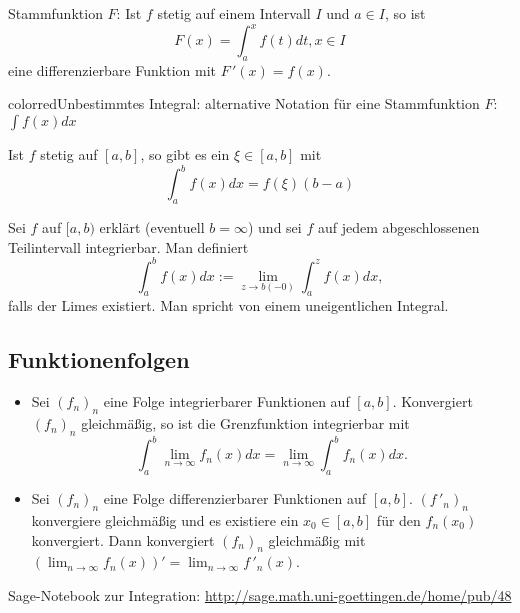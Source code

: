 \documentclass[a4paper,12pt,DIV15]{scrartcl}
\begin{document}
\begin{thm}
{\color{red} Stammfunktion} $F$: Ist $f$ stetig auf einem Intervall $I$ und $a \in I$, so ist 
\[F(x)= \int_a^x f(t) dt, x \in I \] eine differenzierbare Funktion mit
$F\,'(x)=f(x)$. 
\end{thm}
\begin{thm}
{color{red}Unbestimmtes Integral}: alternative Notation für eine Stammfunktion $F$:  $\int f(x) dx$ 
\end{thm}
\begin{thm}
Ist $f$ stetig auf $[a,b]$, so gibt es ein $\xi \in [a,b]$ mit
\[\int_a^b f(x)dx = f(\xi) (b-a)\]
\end{thm}



\begin{defn}
Sei $f$ auf $[a,b)$ erklärt (eventuell $b=\infty$) und sei $f$ auf jedem
abgeschlossenen Teilintervall integrierbar. Man definiert
\[  \int_a^b f(x)dx := \lim_{z \rightarrow b (-0)} \int_a^z f(x)dx,\]
falls der Limes existiert. Man spricht von einem {\color{red}
uneigentlichen Integral}.
\end{defn}

\subsection{Funktionenfolgen}
\begin{itemize}
\item Sei $(f_n)_n$ eine Folge integrierbarer Funktionen auf
$[a,b]$. Konvergiert $(f_n)_n$ gleichmäßig, so ist die Grenzfunktion
integrierbar mit
\[ \int_a^b \lim_{n \rightarrow \infty} f_n(x) dx = \lim_{n
\rightarrow \infty} \int_a^b f_n(x) dx .\]
\item Sei $(f_n)_n$ eine Folge differenzierbarer Funktionen auf
$[a,b]$. $(f\,'_n)_n$ konvergiere gleichmäßig und es existiere ein $x_0
\in [a,b]$ für den $f_n(x_0)$ konvergiert. Dann konvergiert $(f_n)_n$
gleichmäßig mit $( \lim_{n \rightarrow \infty} f_n(x))' = \lim_{n
\rightarrow \infty} f\,'_n(x)$.  
\end{itemize}
 
\begin{center}
    Sage-Notebook zur Integration:
     \url{http://sage.math.uni-goettingen.de/home/pub/48}
 \end{center}
\end{document}
